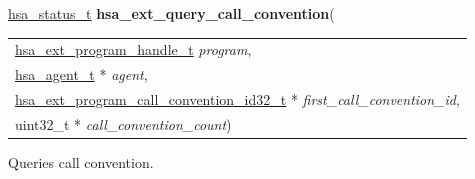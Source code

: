 \documentclass[final]{book}
\newcommand{\hsaarg}[1]{\textit{#1}}
\begin{document}
\noindent\begin{tcolorbox}[breakable,nobeforeafter,colframe=white,colback=lightgray,left=0mm]
\hyperlink{group__status_1gad755322e7ff95456520e8abdbe90d225}{hsa_status_t} \hypertarget{group__HsailLinkerServiceLayer_1gadd184aa33a87b89d17b9ec760b0d4592}{\textbf{hsa_ext_query_call_convention}}(
\vspace{-3.5mm}\begin{longtable}{@{}p{\textwidth}}
\hspace{1.7em}\hyperlink{group__HsailLinkerServiceLayer_1gaea8d90863414407ddba7e318db7412f9}{hsa_ext_program_handle_t} \hsaarg{program},\\
\hspace{1.7em}\hyperlink{group__topology_1gab8db3fb886332a24acac08ec361e1d86}{hsa_agent_t} * \hsaarg{agent},\\
\hspace{1.7em}\hyperlink{group__FinalizerCoreApi_1gad4afadfa0983f1bc637f3add3a006cba}{hsa_ext_program_call_convention_id32_t} * \hsaarg{first_call_convention_id},\\
\hspace{1.7em}uint32_t * \hsaarg{call_convention_count})\end{longtable}

\end{tcolorbox}
Queries call convention.
\end{document}
